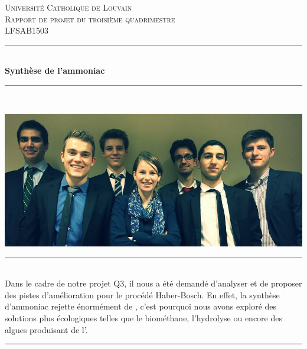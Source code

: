 \documentclass[a4paper]{report}
\newcommand{\HRule}{\rule{\linewidth}{0.5mm}}
\begin{document}
\begin{titlepage}


\begin{center}


\textsc{\Large Université Catholique de Louvain}\\[0.5cm]

\textsc{\LARGE Rapport de projet du troisième quadrimestre}\\[0.2cm]
\textsc{\LARGE LFSAB1503}\\[0.2cm]

\HRule \\[0.2cm]
{\huge \bfseries Synthèse de l'ammoniac}\\
\HRule \\[0.2cm]

\begin{center}
\includegraphics[trim=0cm 0cm 0cm 0cm, clip, width=15cm]{Shema/couverture2.png}
\end{center}
\HRule \\[0.2cm]
Dans le cadre de notre projet Q3, il nous a été demandé d'analyser et de proposer des pistes d'amélioration pour le procédé Haber-Bosch. En effet, la synthèse d'ammoniac rejette énormément de , c'est pourquoi nous avons exploré des solutions plus écologiques telles que le biométhane, l'hydrolyse ou encore des algues produisant de l'.
\HRule \\[0.2cm]


\end{center}
\end{titlepage}
\end{document}
